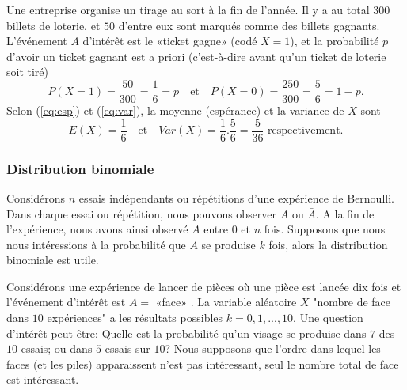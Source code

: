 {\begin{example}
    Une entreprise organise un tirage au sort à la fin de l'année. Il y a au total $300$ billets de loterie, et
    $50$ d'entre eux sont marqués comme des billets gagnants. L'événement $ A $ d'intérêt est le «ticket gagne»
    (codé $ X = 1 $), et la probabilité $ p $ d'avoir un ticket gagnant est a priori (c'est-à-dire avant qu'un ticket
    de loterie soit tiré)
    \begin{equation*}
        P(X=1)=\frac{50}{300}=\frac{1}{6}=p
        \quad\mathrm{  et }\quad
        P(X=0)=\frac{250}{300}=\frac{5}{6}=1-p.
    \end{equation*}
    Selon (\ref{eq:esp}) et (\ref{eq:var}), la moyenne (espérance) et la variance de $ X $ sont
    \begin{equation*}
        E(X)=\frac{1}{6}
        \quad\mathrm{  et }\quad
        Var(X)=\frac{1}{6} . \frac{5}{6}=\frac{5}{36} \text{  respectivement.}
    \end{equation*}
\end{example}

\subsubsection{Distribution binomiale}

Considérons $ n $ essais indépendants ou répétitions d'une expérience de Bernoulli. Dans chaque essai ou répétition,
nous pouvons observer $ A $ ou $ \bar{A} $. A la fin de l'expérience, nous avons ainsi observé $ A $ entre $ 0 $ et
$ n $ fois. Supposons que nous nous intéressions à la probabilité que $ A $ se produise $ k $ fois, alors la
distribution binomiale est utile.

\begin{example}
    Considérons une expérience de lancer de pièces où une pièce est lancée dix fois et l'événement d'intérêt est
    $ A =$ «face» . La variable aléatoire $ X $ "nombre de face dans $ 10 $ expériences" a les résultats possibles
    $ k = 0,1, ..., 10 $. Une question d'intérêt peut être: Quelle est la probabilité qu'un visage se produise dans
    $7$ des $10$ essais; ou dans $5$ essais sur $10$? Nous supposons que l'ordre dans lequel les faces (et les piles)
    apparaissent n'est pas intéressant, seul le nombre total de face est intéressant.
\end{example}

}
